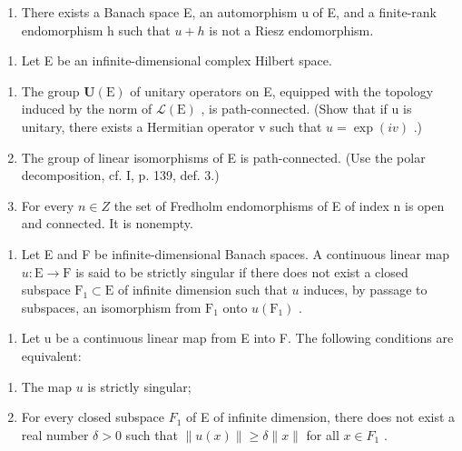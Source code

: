 \begin{enumerate}
\def\labelenumi{\alph{enumi})}
\setcounter{enumi}{1}
\tightlist
\item
  There exists a Banach space E, an automorphism u of E, and a finite-rank endomorphism h such that \(u + h\) is not a Riesz endomorphism.
\end{enumerate}

\begin{enumerate}
\def\labelenumi{\arabic{enumi})}
\setcounter{enumi}{3}
\tightlist
\item
  Let E be an infinite-dimensional complex Hilbert space.
\end{enumerate}

\begin{enumerate}
\def\labelenumi{\alph{enumi})}
\item
  The group \(\mathbf{U}(\mathrm{E})\) of unitary operators on E, equipped with the topology induced by the norm of \(\mathcal{L}(\mathrm{E})\) , is path-connected. (Show that if u is unitary, there exists a Hermitian operator v such that \(u = \exp(iv)\) .)
\item
  The group of linear isomorphisms of E is path-connected. (Use the polar decomposition, cf. I, p. 139, def. 3.)
\item
  For every \(n \in Z\) the set of Fredholm endomorphisms of E of index n is open and connected. It is nonempty.
\end{enumerate}

\begin{enumerate}
\def\labelenumi{\arabic{enumi})}
\setcounter{enumi}{4}
\tightlist
\item
  Let E and F be infinite-dimensional Banach spaces. A continuous linear map \(u: \mathrm{E} \to \mathrm{F}\) is said to be strictly singular if there does not exist a closed subspace \(\mathrm{F}_1 \subset \mathrm{E}\) of infinite dimension such that \(u\) induces, by passage to subspaces, an isomorphism from \(\mathrm{F}_1\) onto \(u(\mathrm{F}_1)\) .
\end{enumerate}

\begin{enumerate}
\def\labelenumi{\alph{enumi})}
\tightlist
\item
  Let u be a continuous linear map from E into F. The following conditions are equivalent:
\end{enumerate}

\begin{enumerate}
\def\labelenumi{(\roman{enumi})}
\item
  The map \(u\) is strictly singular;
\item
  For every closed subspace \(F_{1}\) of E of infinite dimension, there does not exist a real number \(\delta > 0\) such that \(\|u(x)\| \geqslant \delta\|x\|\) for all \(x \in F_{1}\) .
\end{enumerate}

